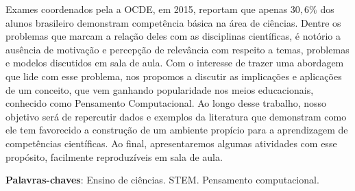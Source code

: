
\setlength{\absparsep}{18pt} %
\begin{resumo}
  Exames coordenados pela a OCDE, em 2015, reportam que apenas $30,6\%$ dos alunos brasileiro demonstram competência básica na área de ciências. Dentre os problemas que marcam a relação deles com as disciplinas científicas, é notório a ausência de motivação e percepção de relevância com respeito a temas, problemas e modelos discutidos em sala de aula. Com o interesse de trazer uma abordagem que lide com esse problema, nos propomos a discutir as implicações e aplicações de um conceito, que vem ganhando popularidade nos meios educacionais, conhecido como Pensamento Computacional. Ao longo desse trabalho, nosso objetivo será de repercutir dados e exemplos da literatura que demonstram como ele tem favorecido a construção de um ambiente propício para a aprendizagem de competências científicas. Ao final, apresentaremos algumas atividades com esse propósito, facilmente reproduzíveis em sala de aula.

 \textbf{Palavras-chaves}: Ensino de ciências. STEM. Pensamento computacional.
\end{resumo}

